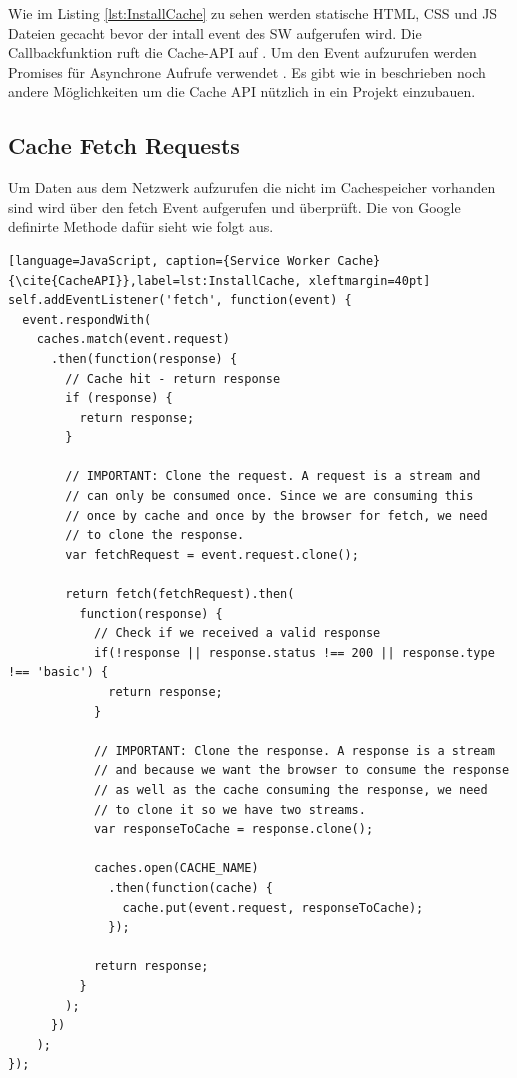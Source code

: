 Wie im Listing \ref{lst:InstallCache}  zu  sehen werden statische HTML, CSS und JS Dateien gecacht bevor der intall event des \acs{SW} aufgerufen wird. Die Callbackfunktion ruft die Cache-API auf \cite{CacheAPI}.
Um den Event aufzurufen werden Promises für Asynchrone Aufrufe verwendet \cite{Promises}.
Es gibt wie in \cite{CacheAPI} beschrieben noch andere Möglichkeiten um die Cache API nützlich in ein Projekt einzubauen.
\newpage
\subsection{Cache Fetch Requests}
Um Daten aus dem Netzwerk aufzurufen die nicht im Cachespeicher vorhanden sind wird über den fetch Event aufgerufen und überprüft. Die von Google definirte Methode dafür sieht wie folgt aus.

\begin{lstlisting}[language=JavaScript, caption={Service Worker Cache} {\cite{CacheAPI}},label=lst:InstallCache, xleftmargin=40pt]
self.addEventListener('fetch', function(event) {
  event.respondWith(
    caches.match(event.request)
      .then(function(response) {
        // Cache hit - return response
        if (response) {
          return response;
        }

        // IMPORTANT: Clone the request. A request is a stream and
        // can only be consumed once. Since we are consuming this
        // once by cache and once by the browser for fetch, we need
        // to clone the response.
        var fetchRequest = event.request.clone();

        return fetch(fetchRequest).then(
          function(response) {
            // Check if we received a valid response
            if(!response || response.status !== 200 || response.type !== 'basic') {
              return response;
            }

            // IMPORTANT: Clone the response. A response is a stream
            // and because we want the browser to consume the response
            // as well as the cache consuming the response, we need
            // to clone it so we have two streams.
            var responseToCache = response.clone();

            caches.open(CACHE_NAME)
              .then(function(cache) {
                cache.put(event.request, responseToCache);
              });

            return response;
          }
        );
      })
    );
});
\end{lstlisting}

